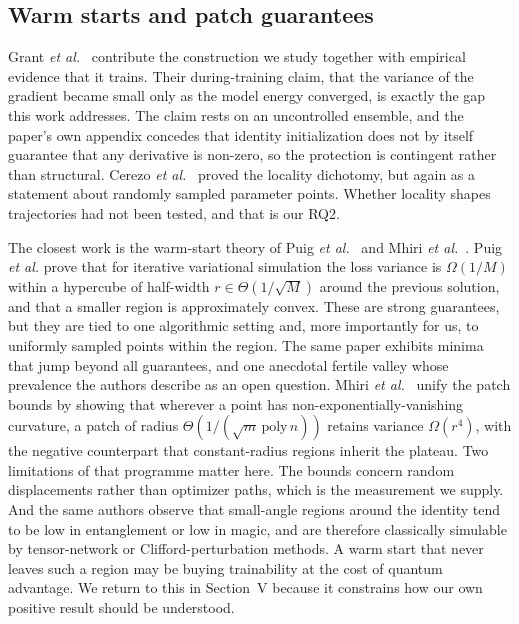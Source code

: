 \documentclass[conference]{IEEEtran}%
\begin{document}
\subsection{Warm starts and patch guarantees}
Grant \emph{et al.}~\cite{grant} contribute the construction we study together with empirical evidence that it trains. Their during-training claim, that the variance of the gradient became small only as the model energy converged, is exactly the gap this work addresses. The claim rests on an uncontrolled ensemble, and the paper's own appendix concedes that identity initialization does not by itself guarantee that any derivative is non-zero, so the protection is contingent rather than structural. Cerezo \emph{et al.}~\cite{cerezo} proved the locality dichotomy, but again as a statement about randomly sampled parameter points. Whether locality shapes trajectories had not been tested, and that is our RQ2.

The closest work is the warm-start theory of Puig \emph{et al.}~\cite{puig} and Mhiri \emph{et al.}~\cite{mhiri}. Puig \emph{et al.} prove that for iterative variational simulation the loss variance is $\Omega(1/M)$ within a hypercube of half-width $r\in\Theta(1/\sqrt M)$ around the previous solution, and that a smaller region is approximately convex. These are strong guarantees, but they are tied to one algorithmic setting and, more importantly for us, to uniformly sampled points within the region. The same paper exhibits minima that jump beyond all guarantees, and one anecdotal fertile valley whose prevalence the authors describe as an open question. Mhiri \emph{et al.}~\cite{mhiri} unify the patch bounds by showing that wherever a point has non-exponentially-vanishing curvature, a patch of radius $\Theta(1/(\sqrt m\,\mathrm{poly}\,n))$ retains variance $\Omega(r^4)$, with the negative counterpart that constant-radius regions inherit the plateau. Two limitations of that programme matter here. The bounds concern random displacements rather than optimizer paths, which is the measurement we supply. And the same authors observe that small-angle regions around the identity tend to be low in entanglement or low in magic, and are therefore classically simulable by tensor-network or Clifford-perturbation methods. A warm start that never leaves such a region may be buying trainability at the cost of quantum advantage. We return to this in Section~V because it constrains how our own positive result should be understood.
\end{document}
